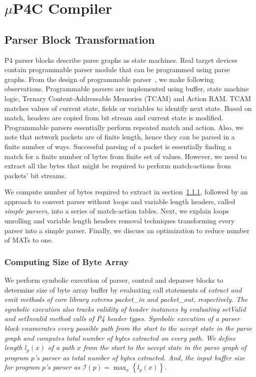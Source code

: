 \section{$\mu$P4C Compiler}
\label{section-mp4c-compiler}


\subsection{Parser Block Transformation}
\label{subsection:parser-block-transformation}
P4 parser blocks describe parse graphs as state machines.
Real target devices contain programmable parser module that can be programmed using parse graphs.
From the design of programmable parser~\cite{6665172}, we make following observations.
Programmable parsers are implemented using buffer, state machine logic, Ternary Content-Addressable Memories (TCAM) and Action RAM. 
TCAM matches values of current state, fields or variables to identify next state. 
Based on match, headers are copied from bit stream and current state is modified.
Programmable parsers essentially perform repeated match and action.
Also, we note that network packets are of finite length, hence they can be parsed in a finite number of ways.
Successful parsing of a packet is essentially finding a match for a finite number of bytes from finite set of values.
However, we need to extract all the bytes that might be required to perform match-actions from packets' bit streams.


We compute number of bytes required to extract in section~\ref{subsubsection:computing-size-of-byte-array}, followed by an approach to convert parser without loops and variable length headers, called \textit{simple parsers}, into a series of match-action tables.
Next, we explain loops unrolling and variable length headers removal techniques transforming every parser into a simple parser.
Finally, we discuss an optimization to reduce number of MATs to one.


\subsubsection{Computing Size of Byte Array}
\label{subsubsection:computing-size-of-byte-array}
We perform symbolic execution of parser, control and deparser blocks to determine size of byte array buffer by evaluating call statements of \em{extract} and \em{emit} methods of core library externs \em{packet\_in} and \em{packet\_out}, respectively.
The symbolic execution also tracks validity of header instances by evaluating \em{setValid} and \em{setInvalid} method calls of P4 header types.
Symbolic execution of a parser block enumerates every possible path from the start to the accept state in the parse graph and computes total number of bytes extracted on every path.
We define length $l_{p}(x)$ of a path $x$ from the start to the accept state in the parse graph of program $p$'s parser as total number of bytes extracted.
And, the input buffer size for program $p$'s parser as $\mathcal{I}(p) = \max_{x}\left\{l_{p}(x)\right\}$. 


